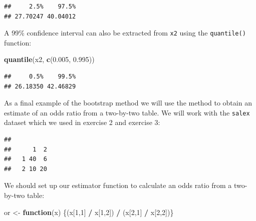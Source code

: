 \documentclass[12pt,a4paper]{book}
\newenvironment{Shaded}{\begin{snugshade}}{\end{snugshade}}
\newcommand{\KeywordTok}[1]{\textcolor[rgb]{0.13,0.29,0.53}{\textbf{#1}}}
\newcommand{\DataTypeTok}[1]{\textcolor[rgb]{0.13,0.29,0.53}{#1}}
\newcommand{\DecValTok}[1]{\textcolor[rgb]{0.00,0.00,0.81}{#1}}
\newcommand{\FloatTok}[1]{\textcolor[rgb]{0.00,0.00,0.81}{#1}}
\newcommand{\StringTok}[1]{\textcolor[rgb]{0.31,0.60,0.02}{#1}}
\newcommand{\OtherTok}[1]{\textcolor[rgb]{0.56,0.35,0.01}{#1}}
\newcommand{\ControlFlowTok}[1]{\textcolor[rgb]{0.13,0.29,0.53}{\textbf{#1}}}
\newcommand{\OperatorTok}[1]{\textcolor[rgb]{0.81,0.36,0.00}{\textbf{#1}}}
\newcommand{\NormalTok}[1]{#1}
\theoremstyle{definition}
\theoremstyle{definition}
\theoremstyle{definition}
\theoremstyle{remark}
\begin{document}
\begin{verbatim}
##     2.5%    97.5% 
## 27.70247 40.04012
\end{verbatim}

A 99\% confidence interval can also be extracted from \texttt{x2} using
the \texttt{quantile()} function:

\begin{Shaded}
\begin{Highlighting}[]
\KeywordTok{quantile}\NormalTok{(x2, }\KeywordTok{c}\NormalTok{(}\FloatTok{0.005}\NormalTok{, }\FloatTok{0.995}\NormalTok{))}
\end{Highlighting}
\end{Shaded}

\begin{verbatim}
##     0.5%    99.5% 
## 26.18350 42.46829
\end{verbatim}

As a final example of the bootstrap method we will use the method to
obtain an estimate of an odds ratio from a two-by-two table. We will
work with the \texttt{salex} dataset which we used in exercise 2 and
exercise 3:

\begin{Shaded}
\end{Shaded}

\begin{verbatim}
##    
##      1  2
##   1 40  6
##   2 10 20
\end{verbatim}

We should set up our estimator function to calculate an odds ratio from
a two-by-two table:

\begin{Shaded}
\begin{Highlighting}[]
\NormalTok{or <-}\StringTok{ }\ControlFlowTok{function}\NormalTok{(x) \{(x[}\DecValTok{1}\NormalTok{,}\DecValTok{1}\NormalTok{] }\OperatorTok{/}\StringTok{ }\NormalTok{x[}\DecValTok{1}\NormalTok{,}\DecValTok{2}\NormalTok{]) }\OperatorTok{/}\StringTok{ }\NormalTok{(x[}\DecValTok{2}\NormalTok{,}\DecValTok{1}\NormalTok{] }\OperatorTok{/}\StringTok{ }\NormalTok{x[}\DecValTok{2}\NormalTok{,}\DecValTok{2}\NormalTok{])\}}
\end{Highlighting}
\end{Shaded}
\end{document}
